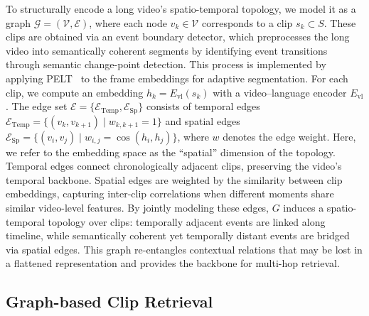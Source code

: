 To structurally encode a long video’s spatio-temporal topology, we model it as a graph $\mathcal{G}=(\mathcal{V},\mathcal{E})$, where each node $v_k \in \mathcal{V}$ corresponds to a clip $s_k \subset S$. These clips are obtained via an event boundary detector, which preprocesses the long video into semantically coherent segments by identifying event transitions through semantic change-point detection. This process is implemented by applying PELT~\cite{PELT} to the frame embeddings for adaptive segmentation. For each clip, we compute an embedding $h_k = E_{\mathrm{vl}}(s_k)$ with a video–language encoder $E_{\mathrm{vl}}$. The edge set $\mathcal{E}=\{\mathcal{E}_{\mathrm{Temp}}, \mathcal{E}_{\mathrm{Sp}}\}$ consists of temporal edges $\mathcal{E}_{\mathrm{Temp}}=\{(v_k,v_{k+1})\mid w_{k,k+1}=1\}$ and spatial edges $\mathcal{E}_{\mathrm{Sp}}=\{(v_i,v_j)\mid w_{i,j}=\cos(h_i,h_j)\}$, where $w$ denotes the edge weight. {Here, we refer to the embedding space as the ``spatial'' dimension of the topology. Temporal edges connect chronologically adjacent clips, preserving the video’s temporal backbone. Spatial edges are weighted by the similarity between clip embeddings, capturing inter-clip correlations when different moments share similar video-level features. By jointly modeling these edges, $G$ induces a spatio-temporal topology over clips: temporally adjacent events are linked along timeline, while semantically coherent yet temporally distant events are bridged via spatial edges. This graph re-entangles contextual relations that may be lost in a flattened representation and provides the backbone for multi-hop retrieval.}


\subsection{Graph-based Clip Retrieval}

